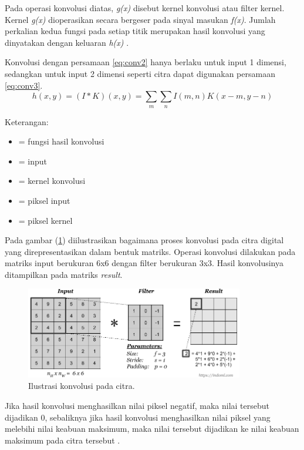 Pada operasi konvolusi diatas, \textit{g(x)} disebut kernel konvolusi atau filter kernel. Kernel \textit{g(x)} dioperasikan secara bergeser pada sinyal masukan \textit{f(x)}. Jumlah perkalian kedua fungsi pada setiap titik merupakan hasil konvolusi yang dinyatakan dengan keluaran \textit{h(x)} \cite{book:munir}. 

Konvolusi dengan persamaan \ref{eq:conv2} hanya berlaku untuk input 1 dimensi, sedangkan untuk input 2 dimensi seperti citra dapat digunakan persamaan \ref{eq:conv3}.
\begin{equation}
    \label{eq:conv3}
h(x,y) = (I*K)(x,y) = \sum_{m} \sum_{n} I(m,n)K(x-m, y-n)
\end{equation}

\noindent Keterangan: 
\begin{itemize}[noitemsep, topsep=0pt]
    \item[]{ = fungsi hasil konvolusi}
    \item[]{ = input}
    \item[]{ = kernel konvolusi}
    \item[]{ = piksel input}
    \item[]{ = piksel kernel}
\end{itemize}

Pada gambar (\ref{fig:conv3}) diilustrasikan bagaimana proses konvolusi pada citra digital yang direpresentasikan dalam bentuk matriks. Operasi konvolusi dilakukan pada matriks input berukuran 6x6 dengan filter berukuran 3x3. Hasil konvolusinya ditampilkan pada matriks \textit{result}.
\begin{figure}[ht]
    \includegraphics[width=0.85\textwidth, center]{images/convolution-operation.png}
    \caption{Ilustrasi konvolusi pada citra.}
    \label{fig:conv3}
\end{figure}

Jika hasil konvolusi menghasilkan nilai piksel negatif, maka nilai tersebut dijadikan 0, sebaliknya jika hasil konvolusi menghasilkan nilai piksel yang melebihi nilai keabuan maksimum, maka nilai tersebut dijadikan ke nilai keabuan maksimum pada citra tersebut \cite{book:sutoyo}.
 

